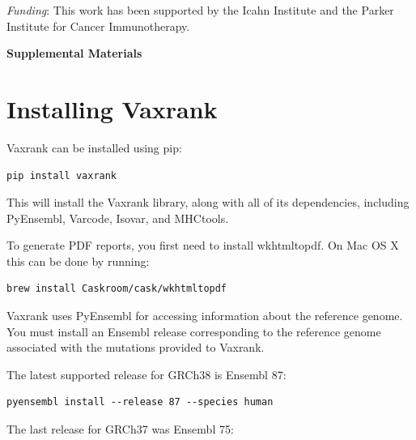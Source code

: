 \documentclass[10pt,letterpaper]{article}
\begin{document}
{\it Funding}: This work has been supported by the Icahn Institute and the Parker Institute for Cancer Immunotherapy.





\pagebreak

\begin{center}
    \textbf{\large Supplemental Materials}
\end{center}

\setcounter{equation}{0}
\setcounter{figure}{0}
\setcounter{table}{0}
\setcounter{page}{1}
\makeatletter
\renewcommand{\theequation}{S\arabic{equation}}
\renewcommand{\thefigure}{S\arabic{figure}}
\renewcommand{\bibnumfmt}[1]{[S#1]}
\renewcommand{\citenumfont}[1]{S#1}

\section*{Installing Vaxrank}
Vaxrank can be installed using pip:

\begin{verbatim}
pip install vaxrank
\end{verbatim}

This will install the Vaxrank library, along with all of its dependencies, including PyEnsembl, Varcode, Isovar, and MHCtools.

To generate PDF reports, you first need to install wkhtmltopdf. On Mac OS X this can be done by running:
\begin{verbatim}
brew install Caskroom/cask/wkhtmltopdf
\end{verbatim}

Vaxrank uses PyEnsembl for accessing information about the reference genome. You must install an Ensembl release corresponding to the reference genome associated with the mutations provided to Vaxrank.

The latest supported release for GRCh38 is Ensembl 87:
\begin{verbatim}
pyensembl install --release 87 --species human
\end{verbatim}

The last release for GRCh37 was Ensembl 75:
\end{document}
